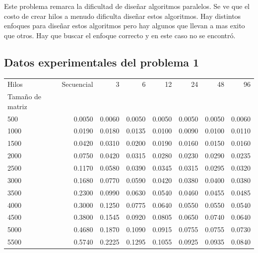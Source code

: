 \documentclass{report}
\begin{document}
Este problema remarca la dificultad de diseñar algoritmos paralelos.
Se ve que el costo de crear hilos a menudo dificulta diseñar estos algoritmos.
Hay distintos enfoques para diseñar estos algoritmos pero hay algunos que llevan
a mas exito que otros. Hay que buscar el enfoque correcto y en este caso no
se encontró.

%
\begin{appendices}

\chapter{Datos experimentales del problema 1}
\label{appendix:starresults}

\begin{table}[H]
\begin{tabular}{lrrrrrrr}
\toprule
Hilos &  Secuencial &       3 &       6 &      12 &      24 &      48 &      96 \\
Tamaño de matriz &             &         &         &         &         &         &         \\
\midrule
500              &      0.0050 &  0.0060 &  0.0050 &  0.0050 &  0.0050 &  0.0050 &  0.0060 \\
1000             &      0.0190 &  0.0180 &  0.0135 &  0.0100 &  0.0090 &  0.0100 &  0.0110 \\
1500             &      0.0420 &  0.0310 &  0.0200 &  0.0190 &  0.0160 &  0.0150 &  0.0160 \\
2000             &      0.0750 &  0.0420 &  0.0315 &  0.0280 &  0.0230 &  0.0290 &  0.0235 \\
2500             &      0.1170 &  0.0580 &  0.0390 &  0.0345 &  0.0315 &  0.0295 &  0.0320 \\
3000             &      0.1680 &  0.0770 &  0.0590 &  0.0420 &  0.0380 &  0.0400 &  0.0380 \\
3500             &      0.2300 &  0.0990 &  0.0630 &  0.0540 &  0.0460 &  0.0455 &  0.0485 \\
4000             &      0.3000 &  0.1250 &  0.0775 &  0.0640 &  0.0550 &  0.0550 &  0.0540 \\
4500             &      0.3800 &  0.1545 &  0.0920 &  0.0805 &  0.0650 &  0.0740 &  0.0640 \\
5000             &      0.4680 &  0.1870 &  0.1090 &  0.0915 &  0.0755 &  0.0755 &  0.0730 \\
5500             &      0.5740 &  0.2225 &  0.1295 &  0.1055 &  0.0925 &  0.0935 &  0.0840 \\

\end{tabular}
\end{table}
\end{appendices}
\end{document}
